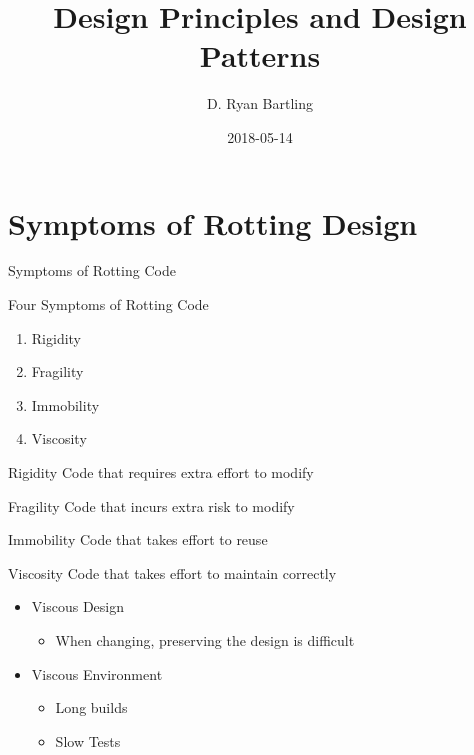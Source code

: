 \documentclass[xcolor=svgnames]{beamer}
\title
  [Design Principles\hspace{2em}]
  {Design Principles and Design Patterns}
\author
  [Ryan Bartling]
  {D. Ryan Bartling}
\date
  {2018-05-14}
\begin{document}
\maketitle

\section
  {Symptoms of Rotting Design}

\begin{frame}
  {Symptoms of Rotting Code}

  Four Symptoms of Rotting Code\pause

  \begin{enumerate}
  \item Rigidity\pause
  \item Fragility\pause
  \item Immobility\pause
  \item Viscosity\pause
  \end{enumerate}
\end{frame}

\begin{frame}{Rigidity}
  Code that requires extra effort to modify
\end{frame}

\begin{frame}{Fragility}
  Code that incurs extra risk to modify
\end{frame}

\begin{frame}{Immobility}
  Code that takes effort to reuse
\end{frame}

\begin{frame}{Viscosity}
  Code that takes effort to maintain correctly

  \begin{itemize}
      \item<2->Viscous Design
      \begin{itemize}
          \item<4->When changing, preserving the design is difficult
      \end{itemize}
          \item<3->Viscous Environment
      \begin{itemize}
          \item<5->Long builds
          \item<6->Slow Tests
      \end{itemize}
  \end{itemize}
\end{frame}
\end{document}
